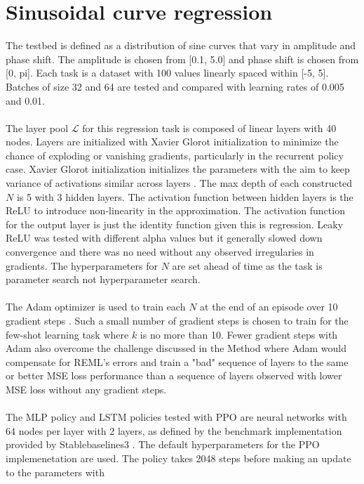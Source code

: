 \section{Sinusoidal curve regression}
The testbed is defined as a distribution of sine curves that vary in 
amplitude and phase shift. The amplitude is chosen from [0.1, 5.0] and 
phase shift is chosen from [0, pi]. Each task is a dataset with 100
values linearly spaced within [-5, 5]. Batches of size 32 and 64 are 
tested and compared with learning rates of 0.005 and 0.01.
\\\\
The layer pool $\mathcal{L}$ for this regression task is composed of linear 
layers with 40 nodes. Layers are initialized with Xavier Glorot initialization to 
minimize the chance of exploding or vanishing gradients, particularly in the 
recurrent policy case. Xavier Glorot initialization initializes the parameters 
with the aim to keep variance of activations similar across layers \cite{XavBen:10}.
The max depth of each constructed $N$ is 5 with 3 hidden 
layers. The activation function between hidden layers is the ReLU to introduce 
non-linearity in the approximation. The activation function for the output layer
is just the identity function given this is regression. Leaky ReLU was tested with 
different alpha values but it generally slowed down convergence and there was no need
without any observed irregularies in gradients. The hyperparameters for $N$ are 
set ahead of time as the task is parameter search not hyperparameter search. 
\\\\
The Adam optimizer is used to train each $N$ at the end of an episode over 10 gradient 
steps \cite{KinBa:14}. Such a small number of gradient steps is chosen to train for the few-shot 
learning task where $k$ is no more than 10. Fewer gradient steps with Adam also 
overcome the challenge discussed in the Method where Adam would compensate for REML's 
errors and train a "bad" sequence of layers to the same or better MSE loss performance 
than a sequence of layers observed with lower MSE loss without any gradient steps.
\\\\
The MLP policy and LSTM policies tested with PPO are neural networks with 64 nodes 
per layer with 2 layers, as defined by the benchmark implementation provided by Stablebaselines3 
\cite{RafHilGleKanErnDor:21}. The default hyperparameters for the PPO implemenetation
are used. The policy takes 2048 steps before making an update to the parameters with
